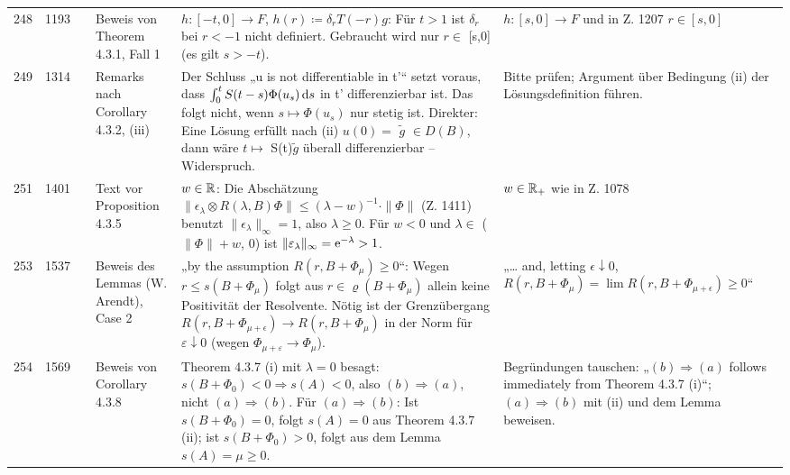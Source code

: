 \documentclass[10pt]{article}
\begin{document}
\begin{longtable}{@{}rrc>{\RaggedRight\arraybackslash}p{3.0cm}>{\RaggedRight\arraybackslash}p{11.4cm}>{\RaggedRight\arraybackslash}p{7.4cm}@{}}
248 & 1193 & \sichB{} & Beweis von Theorem 4.3.1, Fall 1 & $h \colon [-t,0] \to F$, $h(r) \coloneq \delta_{r}T(-r)g$: Für $t > 1$ ist $\ensuremath{\delta}_r$ bei $r < \ensuremath{-}1$ nicht definiert. Gebraucht wird nur $r \ensuremath{\in}$ [s,0] (es gilt $s > \ensuremath{-}t$). & $h \colon [s,0] \to F$ und in Z. 1207 $r \in [s,0]$ \\[2pt]
249 & 1314 & \sichC{} & Remarks nach Corollary 4.3.2, (iii) & Der Schluss „u is not differentiable in t'“ setzt voraus, dass $\int_0^t S(t-s)\Phi(u_s)\mathop{}\!\mathrm{d}{s}$ in t' differenzierbar ist. Das folgt nicht, wenn $s \ensuremath{\mapsto} \ensuremath{\Phi}(u_s)$ nur stetig ist. Direkter: Eine Lösung erfüllt nach (ii) $u(0) =$ \ensuremath{\tilde{g}} $\ensuremath{\in} D(B)$, dann wäre $t \ensuremath{\mapsto}$ S(t)\ensuremath{\tilde{g}} überall differenzierbar – Widerspruch. & Bitte prüfen; Argument über Bedingung (ii) der Lösungsdefinition führen. \\[2pt]
251 & 1401 & \sichC{} & Text vor Proposition 4.3.5 & $w \in \mathbb{R}$: Die Abschätzung $\|\epsilon_\lambda \otimes R(\lambda,B)\Phi\| \leq (\lambda-w)^{-1} \cdot \|\Phi\|$ (Z. 1411) benutzt $\|\epsilon_\lambda\|_\infty = 1$, also $\ensuremath{\lambda} \ensuremath{\geq} 0$. Für $w < 0$ und $\ensuremath{\lambda} \ensuremath{\in}$ ($\ensuremath{\|}\ensuremath{\Phi}\ensuremath{\|} + w$, 0) ist $\|\epsilon_\lambda\|_\infty = \eu^{-\lambda} > 1$. & $w \in \mathbb{R}_{+}$ wie in Z. 1078 \\[2pt]
253 & 1537 & \sichC{} & Beweis des Lemmas (W. Arendt), Case 2 & „by the assumption $R(r,B+\Phi_{\mu}) \geq 0$“: Wegen $r \ensuremath{\leq} s(B+\ensuremath{\Phi}_\ensuremath{\mu})$ folgt aus $r \ensuremath{\in} \ensuremath{\varrho}(B+\ensuremath{\Phi}_\ensuremath{\mu})$ allein keine Positivität der Resolvente. Nötig ist der Grenzübergang $R(r,B+\Phi_{\mu+\epsilon}) \to R(r,B+\Phi_{\mu})$ in der Norm für $\ensuremath{\varepsilon} \ensuremath{\downarrow} 0$ (wegen $\ensuremath{\Phi}_{\ensuremath{\mu}+\ensuremath{\varepsilon}} \ensuremath{\to} \ensuremath{\Phi}_\ensuremath{\mu}$). & „\dots{} and, letting $\epsilon \downarrow 0$, $R(r,B+\Phi_{\mu}) = \lim R(r,B+\Phi_{\mu+\epsilon}) \geq 0$“ \\[2pt]
254 & 1569 & \sichA{} & Beweis von Corollary 4.3.8 & Theorem 4.3.7 (i) mit $\ensuremath{\lambda} = 0$ besagt: $s(B+\ensuremath{\Phi}_0) < 0 \ensuremath{\Rightarrow} s(A) < 0$, also $(b) \ensuremath{\Rightarrow} (a)$, nicht $(a) \ensuremath{\Rightarrow} (b)$. Für $(a) \ensuremath{\Rightarrow} (b)$: Ist $s(B+\ensuremath{\Phi}_0) = 0$, folgt $s(A) = 0$ aus Theorem 4.3.7 (ii); ist $s(B+\ensuremath{\Phi}_0) > 0$, folgt aus dem Lemma $s(A) = \ensuremath{\mu} \ensuremath{\geq} 0$. & Begründungen tauschen: „$(b) \ensuremath{\Rightarrow} (a)$ follows immediately from Theorem 4.3.7 (i)“; $(a) \ensuremath{\Rightarrow} (b)$ mit (ii) und dem Lemma beweisen. \\[2pt]

\end{longtable}
\end{document}
